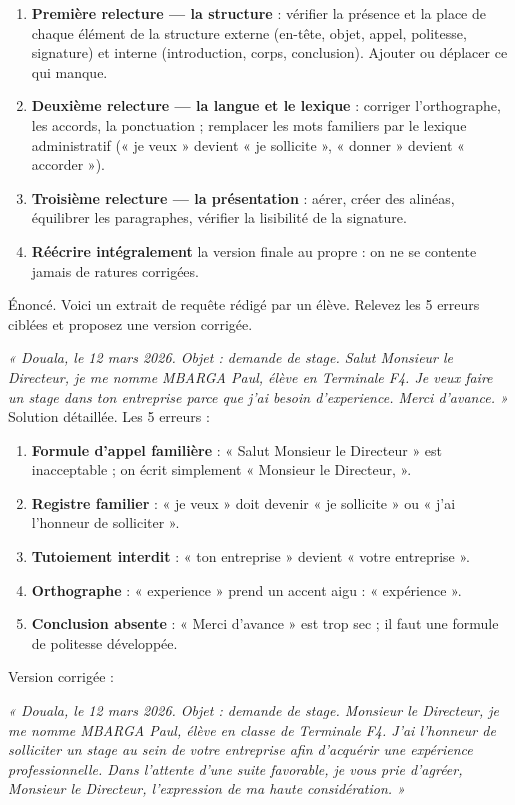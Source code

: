 \documentclass[11pt]{article}
\begin{document}
\begin{methode}
\begin{enumerate}
\item \textbf{Première relecture — la structure} : vérifier la présence et la place de chaque élément de la structure externe (en-tête, objet, appel, politesse, signature) et interne (introduction, corps, conclusion). Ajouter ou déplacer ce qui manque.
\item \textbf{Deuxième relecture — la langue et le lexique} : corriger l'orthographe, les accords, la ponctuation ; remplacer les mots familiers par le lexique administratif (« je veux » devient « je sollicite », « donner » devient « accorder »).
\item \textbf{Troisième relecture — la présentation} : aérer, créer des alinéas, équilibrer les paragraphes, vérifier la lisibilité de la signature.
\item \textbf{Réécrire intégralement} la version finale au propre : on ne se contente jamais de ratures corrigées.
\end{enumerate}
\end{methode}

\begin{exoresolu}
Énoncé. Voici un extrait de requête rédigé par un élève. Relevez les 5 erreurs ciblées et proposez une version corrigée.

\emph{« Douala, le 12 mars 2026. Objet : demande de stage. Salut Monsieur le Directeur, je me nomme MBARGA Paul, élève en Terminale F4. Je veux faire un stage dans ton entreprise parce que j'ai besoin d'experience. Merci d'avance. »}
\tcblower
Solution détaillée. Les 5 erreurs :
\begin{enumerate}
\item \textbf{Formule d'appel familière} : « Salut Monsieur le Directeur » est inacceptable ; on écrit simplement « Monsieur le Directeur, ».
\item \textbf{Registre familier} : « je veux » doit devenir « je sollicite » ou « j'ai l'honneur de solliciter ».
\item \textbf{Tutoiement interdit} : « ton entreprise » devient « votre entreprise ».
\item \textbf{Orthographe} : « experience » prend un accent aigu : « expérience ».
\item \textbf{Conclusion absente} : « Merci d'avance » est trop sec ; il faut une formule de politesse développée.
\end{enumerate}
Version corrigée :

\emph{« Douala, le 12 mars 2026. Objet : demande de stage. Monsieur le Directeur, je me nomme MBARGA Paul, élève en classe de Terminale F4. J'ai l'honneur de solliciter un stage au sein de votre entreprise afin d'acquérir une expérience professionnelle. Dans l'attente d'une suite favorable, je vous prie d'agréer, Monsieur le Directeur, l'expression de ma haute considération. »}
\end{exoresolu}
\end{document}
